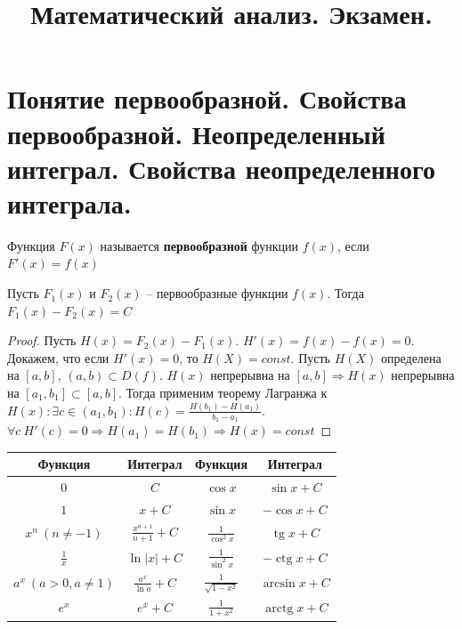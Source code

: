 \documentclass[14pt]{extreport}
\begin{document}
\thispagestyle{empty}
	\title{Математический анализ. Экзамен.}
	\maketitle

	\newpage
	\tableofcontents

    \newpage
    \chapter{Понятие первообразной. Свойства первообразной. Неопределенный интеграл. Свойства неопределенного интеграла.}

    \begin{definition}
        Функция $F(x)$ называется \textbf{первообразной} функции $f(x)$, если $F'(x) = f(x)$
    \end{definition}

    \begin{theorem}
        Пусть $F_1(x) $ и $F_2(x)$ -- первообразные функции $f(x)$. Тогда $F_1(x) - F_2(x) = C$
    \end{theorem}
    \begin{proof}
        Пусть $H(x) = F_2(x) - F_1(x)$. $H'(x) = f(x) - f(x) = 0$. Докажем, что если $H'(x) = 0$, то $H(X) = const$. Пусть $H(X)$ определена на $[a, b]$, $(a, b) \subset D(f)$. $H(x)$ непрерывна на $[a, b] \Rightarrow H(x)$ непрерывна на $[a_1, b_1] \subset [a, b]$. Тогда применим теорему Лагранжа к $H(x): \exists c \in (a_1, b_1) : H(c) = \frac{H(b_1)-H(a_1)}{b_1-a_1}$. $\forall c \: H'(c)=0 \Rightarrow H(a_1)=H(b_1)\Rightarrow H(x )=const$
    \end{proof}
    \begin{center}
        \renewcommand{\arraystretch}{1.5}
        \begin{tabular}{|c|c|||c|c|}
        \hline
        \textbf{Функция} & \textbf{Интеграл} & \textbf{Функция} & \textbf{Интеграл} \\
        \hline
        $0$ & $C$ & $\cos x$ & $\sin x + C$ \\
        \hline
        $1$ & $x + C$ & $\sin x$ & $-\cos x + C$ \\
        \hline
        $x^n \ (n \neq -1)$ & $\frac{x^{n+1}}{n+1} + C$ & $\frac{1}{\cos^2 x}$ & $\operatorname{tg} x + C$ \\
        \hline
        $\frac{1}{x}$ & $\ln|x| + C$ & $\frac{1}{\sin^2 x}$ & $-\operatorname{ctg} x + C$ \\
        \hline
        $a^x \ (a>0, a\neq 1)$ & $\frac{a^x}{\ln a} + C$ & $\frac{1}{\sqrt{1-x^2}}$ & $\arcsin x + C$ \\
        \hline
        $e^x$ & $e^x + C$ & $\frac{1}{1+x^2}$ & $\operatorname{arctg} x + C$ \\
        \hline
        \end{tabular}
    \end{center}
\end{document}
